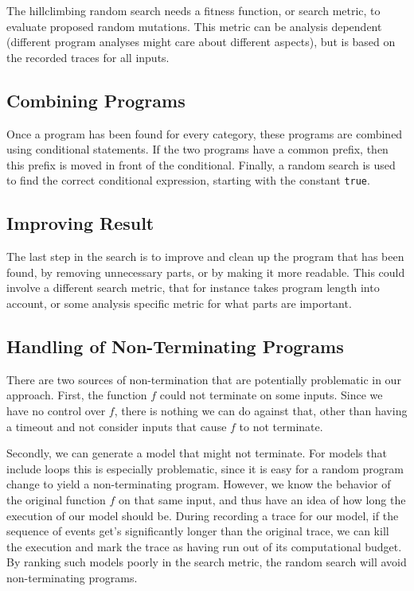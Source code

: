 \documentclass[]{article}
\newcommand{\code}[1]{\lstinline{#1}}
\begin{document}
The hillclimbing random search needs a fitness function, or search metric, to
evaluate proposed random mutations.
This metric can be analysis dependent (different program analyses might care
about different aspects), but is based on the recorded traces for all inputs.



\subsection{Combining Programs}

Once a program has been found for every category, these programs
are combined using conditional statements.  If the two programs
have a common prefix, then this prefix is moved in front of the conditional.
Finally, a random search is used to find the correct conditional
expression, starting with the constant \code{true}.

\subsection{Improving Result}

The last step in the search is to improve and clean up the program
that has been found, by removing unnecessary parts, or by making it
more readable.  This could involve a different search metric, that for instance
takes program length into account, or some analysis specific metric for what
parts are important.

\subsection{Handling of Non-Terminating Programs}

There are two sources of non-termination that are potentially problematic
in our approach.  First, the function $f$ could not terminate on some inputs.
Since we have no control over $f$, there is nothing we can do against that,
other than having a timeout and not consider inputs that cause $f$ to not terminate.

Secondly, we can generate a model that might not terminate.  For models that
include loops this is especially problematic, since it is easy for
a random program change to yield a non-terminating program.  However, we know
the behavior of the original function $f$ on that same input, and thus
have an idea of how long the execution of our model should be.  During
recording a trace for our model, if the sequence of events get's significantly
longer than the original trace, we can kill the execution and mark the
trace as having run out of its computational budget.
By ranking such models poorly in the search metric, the random search will
avoid non-terminating programs.
\end{document}
